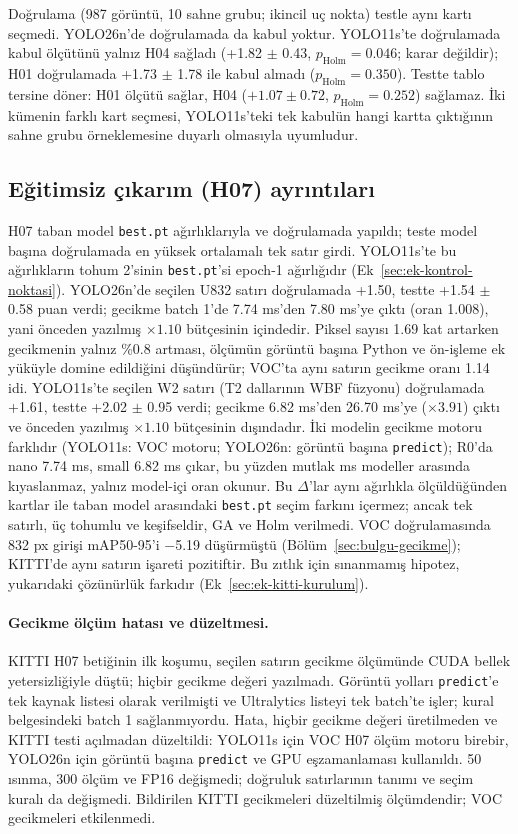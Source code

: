 Doğrulama (987 görüntü, 10 sahne grubu; ikincil uç nokta) testle aynı kartı seçmedi. YOLO26n'de doğrulamada da kabul yoktur. YOLO11s'te doğrulamada kabul ölçütünü yalnız H04 sağladı (+1.82 $\pm$ 0.43, $p_{\mathrm{Holm}}=0.046$; karar değildir); H01 doğrulamada +1.73 $\pm$ 1.78 ile kabul almadı ($p_{\mathrm{Holm}}=0.350$). Testte tablo tersine döner: H01 ölçütü sağlar, H04 ($+1.07\pm0.72$, $p_{\mathrm{Holm}}=0.252$) sağlamaz. İki kümenin farklı kart seçmesi, YOLO11s'teki tek kabulün hangi kartta çıktığının sahne grubu örneklemesine duyarlı olmasıyla uyumludur.

\subsection{Eğitimsiz çıkarım (H07) ayrıntıları}\label{sec:ek-kitti-h07}
H07 taban model \texttt{best.pt} ağırlıklarıyla ve doğrulamada yapıldı; teste model başına doğrulamada en yüksek ortalamalı tek satır girdi. YOLO11s'te bu ağırlıkların tohum 2'sinin \texttt{best.pt}'si epoch-1 ağırlığıdır (Ek~\ref{sec:ek-kontrol-noktasi}). YOLO26n'de seçilen U832 satırı doğrulamada +1.50, testte +1.54 $\pm$ 0.58 puan verdi; gecikme batch 1'de 7.74 ms'den 7.80 ms'ye çıktı (oran 1.008), yani önceden yazılmış $\times1.10$ bütçesinin içindedir. Piksel sayısı 1.69 kat artarken gecikmenin yalnız \%0.8 artması, ölçümün görüntü başına Python ve ön-işleme ek yüküyle domine edildiğini düşündürür; VOC'ta aynı satırın gecikme oranı 1.14 idi. YOLO11s'te seçilen W2 satırı (T2 dallarının WBF füzyonu) doğrulamada +1.61, testte +2.02 $\pm$ 0.95 verdi; gecikme 6.82 ms'den 26.70 ms'ye ($\times3.91$) çıktı ve önceden yazılmış $\times1.10$ bütçesinin dışındadır. İki modelin gecikme motoru farklıdır (YOLO11s: VOC motoru; YOLO26n: görüntü başına \texttt{predict}); R0'da nano 7.74 ms, small 6.82 ms çıkar, bu yüzden mutlak ms modeller arasında kıyaslanmaz, yalnız model-içi oran okunur. Bu $\Delta$'lar aynı ağırlıkla ölçüldüğünden kartlar ile taban model arasındaki \texttt{best.pt} seçim farkını içermez; ancak tek satırlı, üç tohumlu ve keşifseldir, GA ve Holm verilmedi. VOC doğrulamasında 832 px girişi mAP50-95'i $-$5.19 düşürmüştü (Bölüm~\ref{sec:bulgu-gecikme}); KITTI'de aynı satırın işareti pozitiftir. Bu zıtlık için sınanmamış hipotez, yukarıdaki çözünürlük farkıdır (Ek~\ref{sec:ek-kitti-kurulum}).

\paragraph{Gecikme ölçüm hatası ve düzeltmesi.}
KITTI H07 betiğinin ilk koşumu, seçilen satırın gecikme ölçümünde CUDA bellek yetersizliğiyle düştü; hiçbir gecikme değeri yazılmadı. Görüntü yolları \texttt{predict}'e tek kaynak listesi olarak verilmişti ve Ultralytics listeyi tek batch'te işler; kural belgesindeki batch 1 sağlanmıyordu. Hata, hiçbir gecikme değeri üretilmeden ve KITTI testi açılmadan düzeltildi: YOLO11s için VOC H07 ölçüm motoru birebir, YOLO26n için görüntü başına \texttt{predict} ve GPU eşzamanlaması kullanıldı. 50 ısınma, 300 ölçüm ve FP16 değişmedi; doğruluk satırlarının tanımı ve seçim kuralı da değişmedi. Bildirilen KITTI gecikmeleri düzeltilmiş ölçümdendir; VOC gecikmeleri etkilenmedi.

\FloatBarrier
